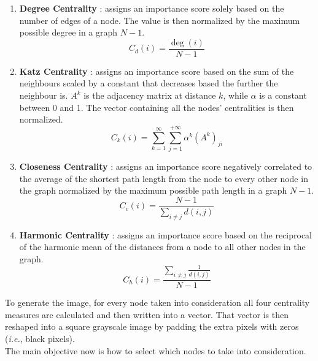\begin{enumerate}
    \item \textbf{Degree Centrality} \cite{freeman2002centrality} : assigns an importance score solely based on the number of edges of a node. The value is then normalized by the maximum possible degree in a graph $N-1$.  \\
    \begin{equation}
        C_{d}(i)=\frac{\operatorname{deg}(i)}{N-1}
    \end{equation}
    \item \textbf{Katz Centrality} \cite{katz1953new} : assigns an importance score based on the sum of the neighbours scaled by a constant that decreases based the further the neighbour is. $A^{k}$ is the adjacency matrix at distance $k$, while $\alpha$ is a constant between 0 and 1. The vector containing all the nodes' centralities is then normalized.  \\
    \begin{equation}
        C_{k}(i)=\sum_{k=1}^{\infty} \sum_{j=1}^{+\infty} \alpha^{k}\left(A^{k}\right)_{j i}
    \end{equation}
    \item \textbf{Closeness Centrality} \cite{freeman2002centrality} : assigns an importance score negatively correlated to the average of the shortest path length from the node to every other node in the graph normalized by the maximum possible path length in a graph $N-1$.  \\
    \begin{equation}
        C_{c}(i)=\frac{N-1}{\sum_{i \neq j} d(i, j)}
    \end{equation}
    \item \textbf{Harmonic Centrality} \cite{marchiori2000harmony} : assigns an importance score based on the reciprocal of the harmonic mean of the distances from a node to all other nodes in the graph.  \\
    \begin{equation}
        C_{h}(i)=\frac{\sum_{i \neq j} \frac{1}{d(i, j)}}{N-1}
    \end{equation}
\end{enumerate}

\noindent To generate the image, for every node taken into consideration all four centrality measures are calculated and then written into a vector. That vector is then reshaped into a square grayscale image by padding the extra pixels with zeros (\textit{i.e.}, black pixels). \\
The main objective now is how to select which nodes to take into consideration.

